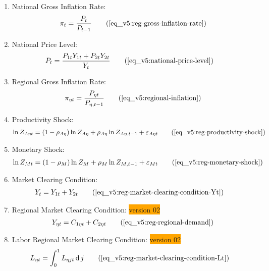 \documentclass[../thesis.tex]{subfiles}
\begin{document}
{\begin{itemize}
\begin{enumerate}
		\item National Gross Inflation Rate:
		\begin{align}
			\pi_t = \frac{P_t}{P_{t-1}} \tag{\ref{eq_v5:reg-gross-inflation-rate}}
		\end{align}
		
		\item National Price Level:
		\begin{align}
			P_{t} &= \frac{P_{1t} Y_{1t} + P_{2t} Y_{2t}}{Y_{t}} \tag{\ref{eq_v5:national-price-level}} %
		\end{align}
		
		\item Regional Gross Inflation Rate:
		\begin{align}
			\pi_{\eta t} = \frac{P_{\eta t}}{P_{\eta, t-1}} \tag{\ref{eq_v5:regional-inflation}}
		\end{align}
		
		\item Productivity Shock:
		\begin{align}
			\ln{Z_{A\eta t}} = (1-\rho_{A\eta})\ln{Z_{A\eta}} + \rho_{A\eta}\ln{Z_{A\eta,t-1}} + \varepsilon_{A\eta t} \tag{\ref{eq_v5:reg-productivity-shock}}
		\end{align}
		
		\item Monetary Shock:
		\begin{align}
			\ln{Z_{Mt}} = (1-\rho_M)\ln{Z_{M}} + \rho_M\ln{Z_{M,t-1}} + \varepsilon_{Mt} \tag{\ref{eq_v5:reg-monetary-shock}}
		\end{align}

		\item Market Clearing Condition:
		\begin{align}
			Y_{t} &= Y_{1 t} + Y_{2 t} \tag{\ref{eq_v5:reg-market-clearing-condition-Yt}}
		\end{align}

		\item Regional Market Clearing Condition: \colorbox{orange}{version 02}
		\begin{align}
			Y_{\eta t} = C_{1\eta t} + C_{2\eta t} \tag{\ref{eq_v5:reg-regional-demand}}
		\end{align}
		
		\item Labor Regional Market Clearing Condition: \colorbox{orange}{version 02}
		\begin{align}
			L_{\eta t} &= \int_{0}^{1} L_{\eta jt} \dif j \tag{\ref{eq_v5:reg-market-clearing-condition-Lt}}
		\end{align}
						
		\end{enumerate}
		
	\end{itemize}
	
} %
\end{document}
